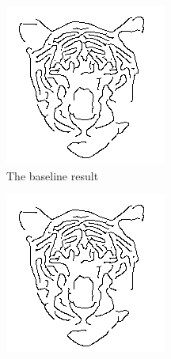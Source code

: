 \begin{figure}
    \centering
    \begin{subfigure}[b]{0.3\textwidth}
            \includegraphics[width=\textwidth]{images/tiger_baseline}
            \caption{The baseline result}
            \label{fig:er_tiger_baseline}
    \end{subfigure}
    \begin{subfigure}[b]{0.3\textwidth}
            \includegraphics[width=\textwidth]{images/tiger_out}

\end{subfigure}
\end{figure}
